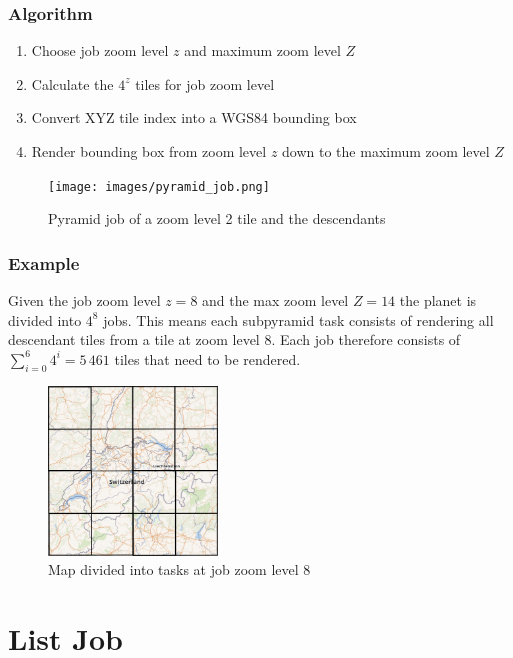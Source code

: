 \subsubsection*{Algorithm}

\begin{enumerate}  
    \item Choose job zoom level $z$ and maximum zoom level $Z$
    \item Calculate the $4^z$ tiles for job zoom level
    \item Convert XYZ tile index into a WGS84 bounding box
    \item Render bounding box from zoom level $z$ down to the maximum zoom level $Z$
\end{enumerate}

\begin{figure}[H]
  \centering
  \texttt{[image: images/pyramid\_job.png]}
  \caption{Pyramid job of a zoom level 2 tile and the descendants}
\end{figure}

\subsubsection*{Example}

Given the job zoom level $z=8$ and the max zoom level $Z=14$ the planet is divided into $4^{8}$ jobs.
This means each subpyramid task consists of rendering all descendant tiles from a tile at zoom level 8.
Each job therefore consists of $\sum_{i=0}^{6} 4^i = 5\,461$ tiles that need to be rendered.  \\

\begin{figure}[H]
  \centering
  \includegraphics[width=0.4\textwidth]{images/switzerland_tiled_z8_small.png}
  \caption{Map divided into tasks at job zoom level 8}
\end{figure}

\section{List Job}\label{list-job}

